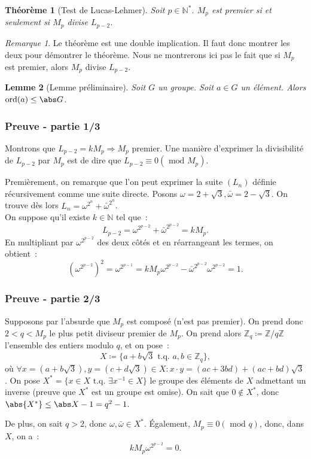 \documentclass[10pt, mathserif]{beamer}
\DeclareMathOperator{\ord}{ord}
\newcommand{\tq}{\text{ t.q. }}
\newcommand{\Z}{\mathbb Z}
\newcommand{\N}{\mathbb N}
\renewcommand{\mod}{\mbox{ mod }}
\newtheorem{thm}{Théorème}[section]
\newtheorem{lem}[thm]{Lemme}
\theoremstyle{definition}
\theoremstyle{remark}
\newtheorem*{rmq}{Remarque}
\begin{document}
	\begin{frame}
		\begin{thm}[Test de Lucas-Lehmer]
			Soit $p \in \N^*$. $M_p$ est premier si et seulement si $M_p$ divise $L_{p-2}$.
		\end{thm}

		\begin{rmq}
			Le théorème est une double implication. Il faut donc montrer les deux pour démontrer le théorème. Nous ne montrerons ici pas le fait que si $M_p$
			est premier, alors $M_p$ divise $L_{p-2}$.
		\end{rmq}

		\begin{lem}[Lemme préliminaire]
			Soit $G$ un groupe. Soit $a \in G$ un élément. Alors $\ord(a) \leq \abs G$.
		\end{lem}
	\end{frame}

	\begin{frame}
		\frametitle{Preuve - partie 1/3}

		Montrons que $L_{p-2} = kM_p \Rightarrow M_p$ premier. Une manière d'exprimer la divisibilité de $L_{p-2}$ par $M_p$ est de dire que
		$L_{p-2} \equiv 0 (\mod M_p)$.

		Premièrement, on remarque que l'on peut exprimer la suite $(L_n)$ définie récursivement comme une suite directe. Posons
		$\omega = 2 + \sqrt 3, \bar \omega = 2 - \sqrt 3$. On trouve dès lors $L_n = \omega^{2^n} + \bar \omega^{2^n}$. \\

		On suppose qu'il existe $k \in \N$ tel que~:
		\[L_{p-2} = \omega^{2^{p-2}} + \bar \omega^{2^{p-2}} = kM_p.\]
		En multipliant par $\omega^{2^{p-2}}$ des deux côtés et en réarrangeant les termes, on obtient~:
		\[\left(\omega^{2^{p-2}}\right)^2 = \omega^{2^{p-1}} = kM_p\omega^{2^{p-2}} - \bar \omega^{2^{p-2}}\omega^{2^{p-2}} = 1.\]
	\end{frame}

	\begin{frame}
		\frametitle{Preuve - partie 2/3}

		Supposons par l'absurde que $M_p$ est composé (n'est pas premier). On prend donc $2 < q < M_p$ le plus petit diviseur premier de $M_p$. On prend
		alors $\Z_q \coloneqq \Z/q\Z$ l'ensemble des entiers modulo $q$, et on pose~:
		\[X \coloneqq \{a + b\sqrt 3 \tq a, b \in \Z_q\},\]
		où $\forall x = (a+b\sqrt 3), y = (c+d\sqrt 3) \in X : x \cdot y = (ac+3bd) + (ac+bd)\sqrt 3$. On pose $X^* = \{x \in X \tq \exists x^{-1} \in X\}$
		le groupe des éléments de $X$ admettant un inverse (preuve que $X^*$ est un groupe est omise). On sait que $0 \not \in X^*$, donc $\abs {X^*} \leq \abs X -1=q^2 - 1$.

		De plus, on sait $q > 2$, donc $\omega, \bar \omega \in X^*$. Également, $M_p \equiv 0 (\mod q)$, donc, dans $X$, on a~:
		\[kM_p\omega^{2^{p-2}} = 0.\]
	\end{frame}
	
\end{document}
